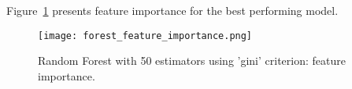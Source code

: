 Figure~\ref{fig:forest_feature_importance} presents feature importance for the best performing model.

\begin{figure}[hbt!]
    \centering
    \texttt{[image: forest\_feature\_importance.png]}
    \caption{Random Forest with 50 estimators using 'gini' criterion: feature importance.}
    \label{fig:forest_feature_importance}
\end{figure}
